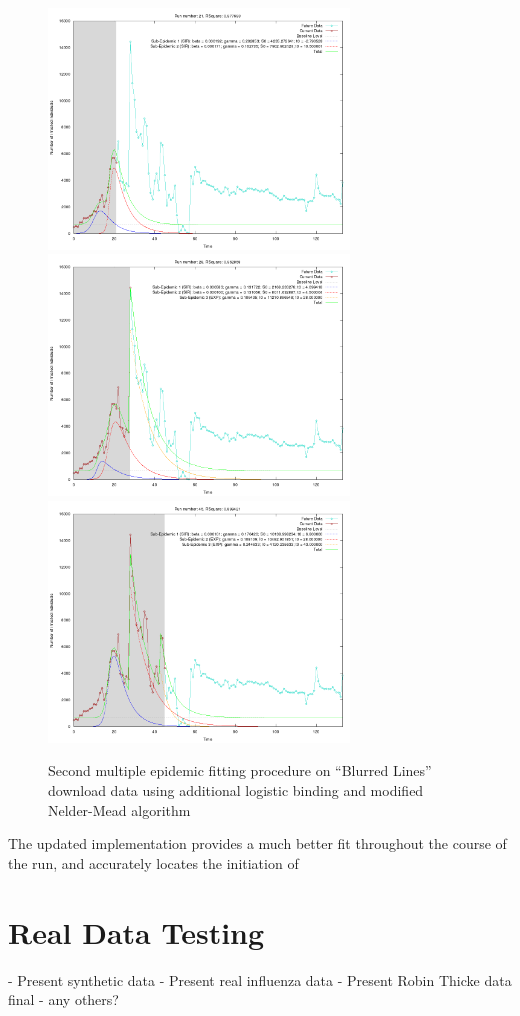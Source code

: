 \begin{centering}
\begin{figure}[h!]
  \includegraphics[width=8cm]{images/multi/goodrt1.png}
  \includegraphics[width=8cm]{images/multi/goodrt2.png}
  \includegraphics[width=8cm]{images/multi/goodrt3.png}
  \caption{Second multiple epidemic fitting procedure on ``Blurred
    Lines'' download data using additional logistic binding and
    modified Nelder-Mead algorithm }
\label{fig:goodrt}
  \end{figure}
\end{centering}

The updated implementation provides a much better fit throughout the
course of the run, and accurately locates the initiation of 


\section{Real Data Testing}
- Present synthetic data
- Present real influenza data
- Present Robin Thicke data final
- any others?


